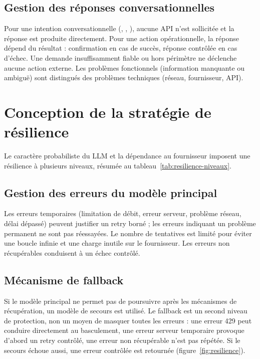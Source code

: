 \documentclass[11pt,a4paper,openany,oneside]{report}
\newcommand{\intent}[1]{\texttt{\detokenize{#1}}}
\begin{document}
\subsection{Gestion des réponses conversationnelles}
Pour une intention conversationnelle (\intent{greeting}, \intent{thanks}, \intent{small_talk}), aucune API n'est sollicitée et la réponse est produite directement. Pour une action opérationnelle, la réponse dépend du résultat : confirmation en cas de succès, réponse contrôlée en cas d'échec. Une demande insuffisamment fiable ou hors périmètre ne déclenche aucune action externe. Les problèmes fonctionnels (information manquante ou ambiguë) sont distingués des problèmes techniques (réseau, fournisseur, API).

\section{Conception de la stratégie de résilience}\label{sec:conc-resilience}
Le caractère probabiliste du LLM et la dépendance au fournisseur imposent une résilience à plusieurs niveaux, résumée au tableau~\ref{tab:resilience-niveaux}.

\subsection{Gestion des erreurs du modèle principal}
Les erreurs temporaires (limitation de débit, erreur serveur, problème réseau, délai dépassé) peuvent justifier un retry borné ; les erreurs indiquant un problème permanent ne sont pas réessayées. Le nombre de tentatives est limité pour éviter une boucle infinie et une charge inutile sur le fournisseur. Les erreurs non récupérables conduisent à un échec contrôlé.

\subsection{Mécanisme de fallback}
Si le modèle principal ne permet pas de poursuivre après les mécanismes de récupération, un modèle de secours est utilisé. Le fallback est un second niveau de protection, non un moyen de masquer toutes les erreurs : une erreur 429 peut conduire directement au basculement, une erreur serveur temporaire provoque d'abord un retry contrôlé, une erreur non récupérable n'est pas répétée. Si le secours échoue aussi, une erreur contrôlée est retournée (figure~\ref{fig:resilience}).
\end{document}

